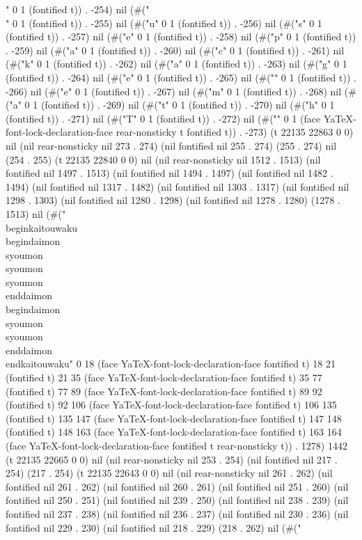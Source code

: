 {" 0 1 (fontified t)) . -254) nil (#("\\" 0 1 (fontified t)) . -255) nil (#("u" 0 1 (fontified t)) . -256) nil (#("s" 0 1 (fontified t)) . -257) nil (#("e" 0 1 (fontified t)) . -258) nil (#("p" 0 1 (fontified t)) . -259) nil (#("a" 0 1 (fontified t)) . -260) nil (#("c" 0 1 (fontified t)) . -261) nil (#("k" 0 1 (fontified t)) . -262) nil (#("a" 0 1 (fontified t)) . -263) nil (#("g" 0 1 (fontified t)) . -264) nil (#("e" 0 1 (fontified t)) . -265) nil (#("{" 0 1 (fontified t)) . -266) nil (#("e" 0 1 (fontified t)) . -267) nil (#("m" 0 1 (fontified t)) . -268) nil (#("a" 0 1 (fontified t)) . -269) nil (#("t" 0 1 (fontified t)) . -270) nil (#("h" 0 1 (fontified t)) . -271) nil (#("T" 0 1 (fontified t)) . -272) nil (#("}" 0 1 (face YaTeX-font-lock-declaration-face rear-nonsticky t fontified t)) . -273) (t 22135 22863 0 0) nil (nil rear-nonsticky nil 273 . 274) (nil fontified nil 255 . 274) (255 . 274) nil (254 . 255) (t 22135 22840 0 0) nil (nil rear-nonsticky nil 1512 . 1513) (nil fontified nil 1497 . 1513) (nil fontified nil 1494 . 1497) (nil fontified nil 1482 . 1494) (nil fontified nil 1317 . 1482) (nil fontified nil 1303 . 1317) (nil fontified nil 1298 . 1303) (nil fontified nil 1280 . 1298) (nil fontified nil 1278 . 1280) (1278 . 1513) nil (#("\\begin{kaitouwaku}
  \\begin{daimon}
    \\syoumon
    \\syoumon
    \\syoumon
  \\end{daimon}
  \\begin{daimon}
    \\syoumon
    \\syoumon
  \\end{daimon}
\\end{kaitouwaku}" 0 18 (face YaTeX-font-lock-declaration-face fontified t) 18 21 (fontified t) 21 35 (face YaTeX-font-lock-declaration-face fontified t) 35 77 (fontified t) 77 89 (face YaTeX-font-lock-declaration-face fontified t) 89 92 (fontified t) 92 106 (face YaTeX-font-lock-declaration-face fontified t) 106 135 (fontified t) 135 147 (face YaTeX-font-lock-declaration-face fontified t) 147 148 (fontified t) 148 163 (face YaTeX-font-lock-declaration-face fontified t) 163 164 (face YaTeX-font-lock-declaration-face fontified t rear-nonsticky t)) . 1278) 1442 (t 22135 22665 0 0) nil (nil rear-nonsticky nil 253 . 254) (nil fontified nil 217 . 254) (217 . 254) (t 22135 22643 0 0) nil (nil rear-nonsticky nil 261 . 262) (nil fontified nil 261 . 262) (nil fontified nil 260 . 261) (nil fontified nil 251 . 260) (nil fontified nil 250 . 251) (nil fontified nil 239 . 250) (nil fontified nil 238 . 239) (nil fontified nil 237 . 238) (nil fontified nil 236 . 237) (nil fontified nil 230 . 236) (nil fontified nil 229 . 230) (nil fontified nil 218 . 229) (218 . 262) nil (#("%
}

